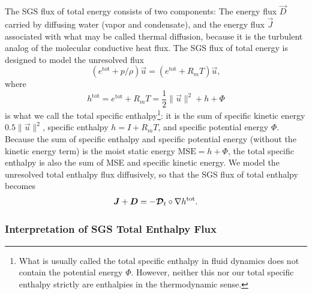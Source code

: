 \documentclass{report}
\begin{document}
The SGS flux of total energy consists of two components: The energy flux $\vec{D}$ carried by diffusing water (vapor and condensate), and the energy flux $\vec{J}$ associated with what may be called thermal diffusion, because it is the turbulent analog of the molecular conductive heat flux. The SGS flux of total energy is designed to model the unresolved flux 
\[
(e^{\mathrm{tot}} + p/\rho) \vec{u} = (e^{\mathrm{tot}} + R_m T) \vec{u}, 
\]
where
\[
h^{\mathrm{tot}} = e^{\mathrm{tot}} + R_m T = \frac{1}{2} \| \vec{u} \|^2 + h + \Phi
\]
is what we call the total specific enthalpy\footnote{What is usually called the total specific enthalpy in fluid dynamics does not contain the potential energy $\Phi$. However, neither this nor our total specific enthalpy strictly are enthalpies in the thermodynamic sense.}: it is the sum of specific kinetic energy $0.5 \| \vec{u} \|^2$, specific enthalpy $h = I + R_m T$, and specific potential energy $\Phi$. Because the sum of specific enthalpy and specific potential energy (without the kinetic energy term) is the moist static energy $\mathrm{MSE} = h + \Phi$, the total specific enthalpy is also the sum of MSE and specific kinetic energy. We model the unresolved total enthalpy flux diffusively, so that the SGS flux of total enthalpy becomes
\begin{equation}\label{e:SGS_energy_flux}
\boldsymbol{{J}} + \boldsymbol{{D}} = - \boldsymbol{{\mathcal{D}}}_t \circ \nabla h^{\mathrm{tot}}.
\end{equation}

\subsubsection{Interpretation of SGS Total Enthalpy Flux}
\end{document}
